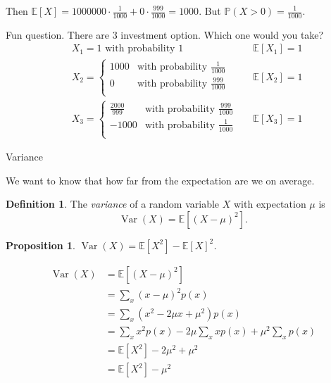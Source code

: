 \documentclass[a4paper,11pt]{amsbook}
\makeatletter
\def\section{\@startsection{section}{2}%
    \z@{1\linespacing\@plus1\linespacing}{.5\linespacing}%
    {\large\normalfont\bfseries\centering\color{darkblue}}}
\renewenvironment{proof}[1][\proofname]{\par
    \pushQED{\qed}%
    \normalfont \topsep6\p@\@plus6\p@\relax
    \trivlist
    \itemindent\z@ %
    \item[\hskip\labelsep
          \scshape
      #1\@addpunct{.}]\ignorespaces
}{%
    \popQED\endtrivlist\@endpefalse
}
\newtheorem{proposition}{\hspace{-2em} \color{darkblue} Proposition}[chapter]
\theoremstyle{definition}
\newtheorem{definition}{\hspace{-2em} \color{darkblue} Definition}[chapter]
\theoremstyle{remark}
\newcommand{\E}{\mathbb{E}}
\renewcommand{\P}{\mathbb{P}}
\DeclareMathOperator\Var{Var}
\newcommand\0{\varnothing}
\makeatother
\begin{document}
    Then $\E[X]=1000000\cdot\frac{1}{1000}+0\cdot\frac{999}{1000}=1000$. But $\P(X>0)=\frac{1}{1000}$.
    
    Fun question. There are 3 investment option. Which one would you take?
    \begin{align*}
        &X_1=1 \text{ with probability }1 && \E[X_1]=1 \\
        &X_2=\begin{cases}
            1000 & \text{with probability }\frac{1}{1000} \\[10pt]
            0 & \text{with probability }\frac{999}{1000} \\
        \end{cases} && \E[X_2]=1 \\[5pt]
        &X_3=\begin{cases}
            \frac{2000}{999} & \text{with probability }\frac{999}{1000} \\[10pt]
            -1000 & \text{with probability }\frac{1}{1000} \\
        \end{cases} && \E[X_3]=1 
    \end{align*}

    \section{Variance}

    We want to know that how far from the expectation are we on average.
    \begin{definition}
        The \emph{variance} of a random variable $X$ with expectation $\mu$ is $$\Var(X)=\E[(X-\mu)^2].$$
    \end{definition}

    \begin{proposition}
        $\Var(X)=\E[X^2]-\E[X]^2$.
    \end{proposition}
    \begin{proof}
        \begin{align*}
            \Var(X)&=\E[(X-\mu)^2] \\
            &=\sum_x(x-\mu)^2p(x) \\
            &=\sum_x(x^2-2\mu x+\mu^2)p(x) \\
            &=\sum_xx^2p(x)-2\mu\sum_x xp(x)+\mu^2\sum_xp(x) \\
            &=\E[X^2]-2\mu^2+\mu^2 \\
            &=\E[X^2]-\mu^2
        \end{align*}
    \end{proof}
\end{document}
